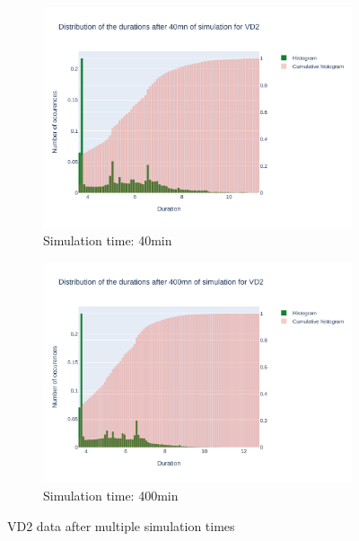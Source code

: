 \documentclass{article}
\begin{document}
\begin{figure}[H]
\begin{subfigure}{.495\textwidth}
        \vspace{.5cm}
    \end{subfigure}
    \begin{subfigure}{.495\textwidth}
        \centering
        \includegraphics[width=\textwidth]{../fig/data/VD2_40mn.png}
        \caption{Simulation time: 40min}
    \end{subfigure}
    \begin{subfigure}{.495\textwidth}
        \centering
        \includegraphics[width=\textwidth]{../fig/data/VD2_400mn.png}
        \caption{Simulation time: 400min}
    \end{subfigure}
    \caption{VD2 data after multiple simulation times}
\end{figure}
\end{document}
